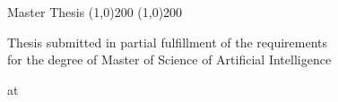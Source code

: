 %
%
%

\makeatletter
\begin{titlepage}

  \vspace*{2cm}
  \center \Large Master Thesis
  \center \line(1,0){200}
  \vspace{0.1cm}
  \makethesistitle
  \vspace{0.1cm}
  \center \line(1,0){200}
  \vspace{4cm}
  \begin{center}
    \small
    Thesis submitted in partial fulfillment of the requirements\\ for the degree of Master of Science of Artificial Intelligence
  \end{center}
  \center \small at
  \makeinstitution

\end{titlepage}
\makeatother
